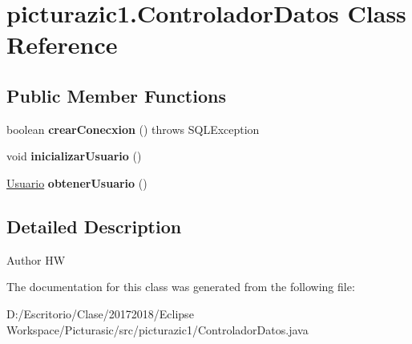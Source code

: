 \hypertarget{classpicturazic1_1_1_controlador_datos}{}\section{picturazic1.\+Controlador\+Datos Class Reference}
\label{classpicturazic1_1_1_controlador_datos}
\subsection*{Public Member Functions}
\begin{DoxyCompactItemize}
\item 
\mbox{\label{classpicturazic1_1_1_controlador_datos_a82815ab2c79255c6087dbc0165d917bd}} 
boolean {\bfseries crear\+Conecxion} ()  throws S\+Q\+L\+Exception 
\item 
\mbox{\label{classpicturazic1_1_1_controlador_datos_ac929336070f713ca3cdc703b1a76a070}} 
void {\bfseries inicializar\+Usuario} ()
\item 
\mbox{\label{classpicturazic1_1_1_controlador_datos_a44a859236ba011fa557e718379f50018}} 
\mbox{\hyperlink{classmodelo_1_1_usuario}{Usuario}} {\bfseries obtener\+Usuario} ()
\end{DoxyCompactItemize}


\subsection{Detailed Description}
\begin{DoxyAuthor}{Author}
HW 
\end{DoxyAuthor}


The documentation for this class was generated from the following file\+:\begin{DoxyCompactItemize}
\item 
D\+:/\+Escritorio/\+Clase/20172018/\+Eclipse Workspace/\+Picturasic/src/picturazic1/Controlador\+Datos.\+java\end{DoxyCompactItemize}
